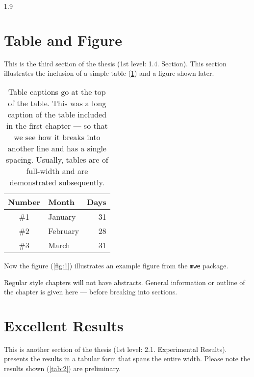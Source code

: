 \documentclass[ms-thesis,12pt,mathdesign]{ndsu-thesis-2022}
\newcommand\myspacing{1.9} %
\begin{document}
\begin{spacing}{\myspacing}
\section{Table and Figure}
This is the third section of the thesis (1st level: 1.4. Section). This section illustrates the inclusion of a simple table (\cref{tab:1}) and a figure shown later.

\begin{table}[h]
\centering
\caption{Table captions go at the top of the table. This was a long caption of the table included in the first chapter --- so that we see how it breaks into another line and has a single spacing. Usually, tables are of full-width and are demonstrated subsequently.}
\vspace{-1ex}
\begin{tabular}{clr}
\toprule
Number & Month & Days\\
\midrule
\#1 & January    & 31\\
\#2 & February   & 28\\
\#3 & March      & 31\\
\bottomrule
\end{tabular}
\label{tab:1}
\end{table}	\kant[7]

Now the figure (\cref{fig:1}) illustrates an example figure from the \texttt{mwe} package.

\kant[8-9]


Regular style chapters will not have abstracts. General information or outline of the chapter is given here --- before breaking into sections. 

\section{Excellent Results}
This is another section of the thesis (1st level: 2.1. Experimental Results). presents the results in a tabular form that spans the entire width. Please note the results shown (\cref{tab:2}) are preliminary.


\end{spacing}
\end{document}
